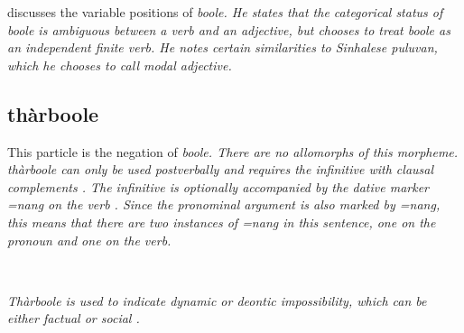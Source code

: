 %


\citet{Slomanson2007test} discusses the  variable positions of \em boole\em. He states that the categorical status of \em boole \em is ambiguous between a verb and an adjective, but chooses to  treat \em  boole \em as an independent finite verb. He notes certain similarities to Sinhalese \em puluvan\em, which he chooses to call \em modal adjective\em.

\subsection{thàrboole}\label{sec:wc:therboole}
This particle is the negation of \em boole\em. There are no allomorphs of this morpheme. \em thàrboole \em can only be used postverbally and requires   the infinitive with clausal complements . The infinitive is optionally accompanied by the dative marker \em =nang \em on the verb . Since the pronominal argument is also marked by \em =nang\em, this means that there are two instances of \em =nang \em in this sentence, one on the pronoun and one on the verb.



\\




\em Thàrboole \em is used to indicate dynamic or deontic impossibility, which can be either factual  or social .


